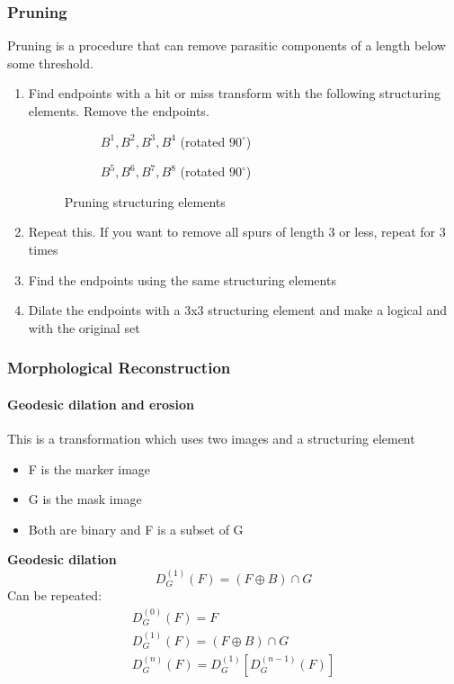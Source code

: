 \subsubsection{Pruning}
Pruning is a procedure that can remove parasitic components of a length below some threshold.\\
\begin{enumerate}
\item Find endpoints with a hit or miss transform with the following structuring elements. Remove the endpoints.
\begin{figure}[h!]
\centering
\begin{subfigure}[b]{0.45\textwidth}
\centering
{}
\caption{$B^1, B^2, B^3, B^4$ (rotated $90^\circ$)}
\end{subfigure}
\begin{subfigure}[b]{0.45\textwidth}
\centering
{}
\caption{$B^5, B^6, B^7, B^8$ (rotated $90^\circ$)}
\end{subfigure}
\caption{Pruning structuring elements}
\end{figure}
\item Repeat this. If you want to remove all spurs of length 3 or less, repeat for 3 times
\item Find the endpoints using the same structuring elements
\item Dilate the endpoints with a 3x3 structuring element and make a logical and with the original set
\end{enumerate}

\subsubsection{Morphological Reconstruction}
\paragraph{Geodesic dilation and erosion}
This is a transformation which uses two images and a structuring element
\begin{itemize}
\item F is the marker image
\item G is the mask image
\item Both are binary and F is a subset of G
\end{itemize}
\textbf{Geodesic dilation}
\[
	D_G^{(1)}(F) = (F\oplus B)\cap G
\]
Can be repeated:
\begin{align*}
	D_G^{(0)}(F) = F \\
	D_G^{(1)}(F) = (F\oplus B)\cap G\\
	D_G^{(n)}(F) = D_G^{(1)}[D_G^{(n-1)}(F)]
\end{align*}

